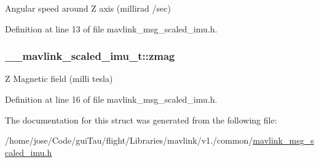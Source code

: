Angular speed around Z axis (millirad /sec) 



Definition at line 13 of file mavlink\-\_\-msg\-\_\-scaled\-\_\-imu.\-h.

\hypertarget{struct____mavlink__scaled__imu__t_a10577e1d6e32fc231527134352ea9587}{
\subsubsection[{zmag}]{ \-\_\-\-\_\-mavlink\-\_\-scaled\-\_\-imu\-\_\-t\-::zmag}}\label{struct____mavlink__scaled__imu__t_a10577e1d6e32fc231527134352ea9587}


Z Magnetic field (milli tesla) 



Definition at line 16 of file mavlink\-\_\-msg\-\_\-scaled\-\_\-imu.\-h.



The documentation for this struct was generated from the following file\-:\begin{DoxyCompactItemize}
\item 
/home/jose/\-Code/gui\-Tau/flight/\-Libraries/mavlink/v1./common/\hyperlink{mavlink__msg__scaled__imu_8h}{mavlink\-\_\-msg\-\_\-scaled\-\_\-imu.\-h}\end{DoxyCompactItemize}
